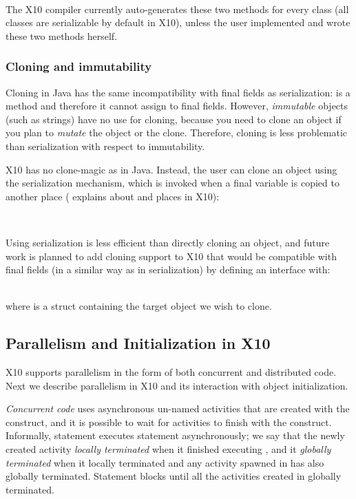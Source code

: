 ~~~~~~~~\\
The X10 compiler currently auto-generates these two methods for every class (all classes are serializable by default in X10),
    unless the user implemented  and wrote these two methods herself.

\subsubsection{Cloning and immutability}
\label{Section:Cloning}
Cloning in Java has the same incompatibility with final fields as serialization:
     is a method and therefore it cannot assign to final fields.
However, \emph{immutable} objects (such as strings) have no use for cloning,
    because you need to clone an object if you plan to \emph{mutate} the object or the clone.
Therefore, cloning is less problematic than serialization with respect to immutability.

X10 has no clone-magic as in Java.
Instead, the user can clone an object using the serialization mechanism,
    which is invoked when a final variable is copied to another place
    ( explains about  and places in X10):

~~~~~~~~

Using serialization is less efficient than directly cloning an object,
    and future work is planned to add cloning support to X10
    that would be compatible with final fields
    (in a similar way as in serialization) by defining an interface  with:

~~~~~~~~\\
where  is a struct containing the target object we wish to clone.




\subsection{Parallelism and Initialization in X10}
\label{Section:Parallelism}
X10 supports parallelism in the form of both concurrent and distributed code.
Next we describe parallelism in X10 and its interaction with object initialization.

\emph{Concurrent code} uses asynchronous un-named activities that are created with the  construct,
    and it is possible to wait for activities to finish with the  construct.
Informally, statement  executes statement  asynchronously;
    we say that the newly created activity \emph{locally terminated} when it finished executing ,
        and it \emph{globally terminated} when it locally terminated and any activity spawned in 
            has also globally terminated.
Statement  blocks until all the activities created in  globally terminated.

